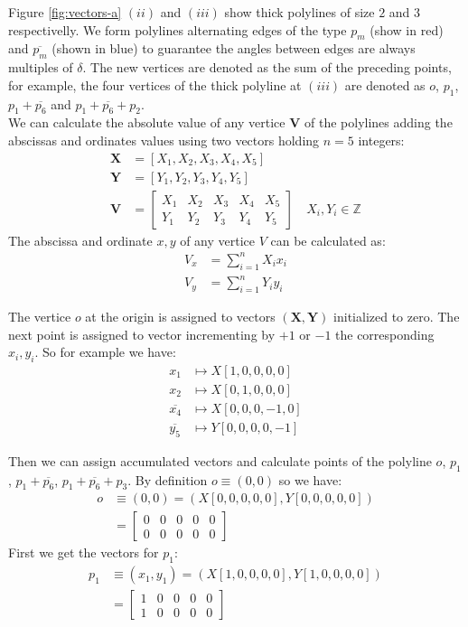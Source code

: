 \documentclass[11pt]{article}
\begin{document}
Figure \ref{fig:vectors-a} $(ii)$ and $(iii)$ show thick polylines of size $2$ and $3$ respectivelly. We form polylines alternating edges of the type $p_m$ (show in red) and $\overline{p_m}$  (shown in blue) to guarantee the angles between edges are always multiples of $\delta$. The new vertices are denoted as the sum of the preceding points, for example, the four vertices of the thick polyline at $(iii)$ are denoted as $o$, $p_1$, $p_1 + \overline{p_6}$ and $p_1 + \overline{p_6} + p_2$.
\\
We can calculate the absolute value of any vertice $\textbf{V}$ of the polylines adding the abscissas and ordinates values using two vectors holding $n=5$ integers:
\begin{align}
\textbf{X} &= [X_1, X_2, X_3, X_4, X_5] \\
\textbf{Y} &= [Y_1, Y_2, Y_3, Y_4, Y_5] \\
\textbf{V} &= \left[\begin{array}{ccccc}X_1&X_2&X_3&X_4&X_5
  \\ Y_1&Y_2&Y_3&Y_4&Y_5 \end{array}\right] \quad X_i,Y_i \in \mathbb{Z}
\end{align}
The abscissa and ordinate $x,y$ of any vertice $V$ can be calculated as:
\begin{align}
V_x &= \sum_{i=1}^{n}X_ix_i\\
V_y &= \sum_{i=1}^{n}Y_iy_i
\end{align}



The vertice $o$ at the origin is assigned to vectors $(\textbf{X},\textbf{Y})$ initialized to zero. The next point is assigned to vector incrementing by $+1$ or $-1$ the corresponding $x_i, y_i$. So for example we have:
\begin{align*}
x_1 &\mapsto X[1,0,0,0,0] \\
x_2 &\mapsto X[0,1,0,0,0] \\
\overline{x_4} &\mapsto X[0,0,0,-1,0] \\
\overline{y_5} &\mapsto Y[0,0,0,0,-1]
\end{align*}

Then we can assign accumulated vectors and calculate points of the polyline $o$, $p_1$, $p_1+\overline{p_6}$, $p_1+\overline{p_6}+p_3$. By definition $o \equiv (0,0) $ so we have:
\begin{align}
o &\equiv (0,0) = (X[0,0,0,0,0],Y[0,0,0,0,0])\\
  &= \left[\begin{array}{ccccc}0&0&0&0&0 \\ 0&0&0&0&0 \end{array}\right]
\end{align}
First we get the vectors for $p_1$:
\begin{align}
p_1 &\equiv (x_1,y_1) = (X[1,0,0,0,0],Y[1,0,0,0,0])\nonumber\\
 &= \left[\begin{array}{ccccc}1&0&0&0&0 \\ 1&0&0&0&0 \end{array}\right]
\end{align}
\end{document}
